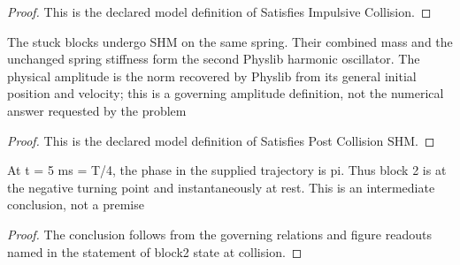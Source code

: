 \begin{proof}
  This is the declared model definition of Satisfies Impulsive Collision.
\end{proof}
\begin{definition}
  \label{def:physics:phyx-mini-0261:phyxminiproblems-problemphyxmini0261-satisfiespostcollisionshm}
  The stuck blocks undergo SHM on the same spring. Their combined mass and the unchanged spring stiffness form the second Physlib harmonic oscillator. The physical amplitude is the norm recovered by Physlib from its general initial position and velocity; this is a governing amplitude definition, not the numerical answer requested by the problem
\end{definition}
\begin{proof}
  This is the declared model definition of Satisfies Post Collision SHM.
\end{proof}
\begin{lemma}
  \label{lem:physics:phyx-mini-0261:phyxminiproblems-problemphyxmini0261-block2-state-at-collision}
  At t = 5 ms = T/4, the phase in the supplied trajectory is pi. Thus block 2 is at the negative turning point and instantaneously at rest. This is an intermediate conclusion, not a premise
\end{lemma}
\begin{proof}
  The conclusion follows from the governing relations and figure readouts named in the statement of block2 state at collision.
\end{proof}
